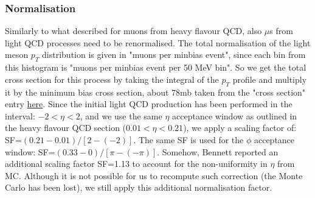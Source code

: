 \documentclass[12pt]{article}
\begin{document}
\subsubsection{Normalisation}
Similarly to what described for muons from heavy flavour QCD, also $\mu$s from light QCD processes need to be renormalised. 
The total normalisation of the light meson $p_{T}$ distribution is given in "muons per minbias event", since each bin from this histogram is "muons per minbias event per 50 MeV bin". So we get the total cross section for this process by taking the integral of the $p_{T}$ profile and multiply it by the minimum bias cross section, about 78mb taken from the "cross section" entry \href{https://cms-pdmv.cern.ch/mcm/public/restapi/requests/get/PPD-2022CommissionGS-00001}{here}.
Since the initial light QCD production has been performed in the interval: $ - 2 < \eta < 2 $, and we use the same $\eta$ acceptance window as outlined in the heavy flavour QCD section ($ 0.01 < \eta < 0.21 $), we apply a scaling factor of: SF=$ ( 0.21 - 0.01 ) / [ 2 - (-2) ]$. The same SF is used for the $\phi$ acceptance window: SF=$ ( 0.33 - 0 ) / [ \pi - (-\pi) ]$. 
Somehow, Bennett reported an additional scaling factor SF=1.13 to account for the non-uniformity in $\eta$ from MC. Although it is not possible for us to recompute such correction (the Monte Carlo has been lost), we still apply this additional normalisation factor. 

\clearpage
\end{document}
